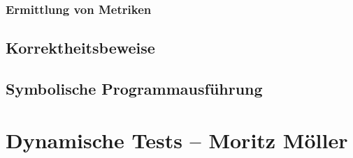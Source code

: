 \documentclass[	%
		fontsize=11pt,  %
		a4paper,	    %
		german,		%
		sans,			%
		f4,				%
	]{HsH-report}		%
\begin{document}
		\subsection{Ermittlung von Metriken}
			\lipsum[1]
	\section{Korrektheitsbeweise}
		\lipsum[1-2]
	\section{Symbolische Programmausführung}
		\lipsum[1-2]

\chapter{Dynamische Tests -- Moritz Möller} \label{chap: dynamic}
	\lipsum[1-20]

\noindent\begin{minipage}{\textwidth} %
	\printbibliography
	\listoffigures
	\listoftables
\end{minipage}
\end{document}
